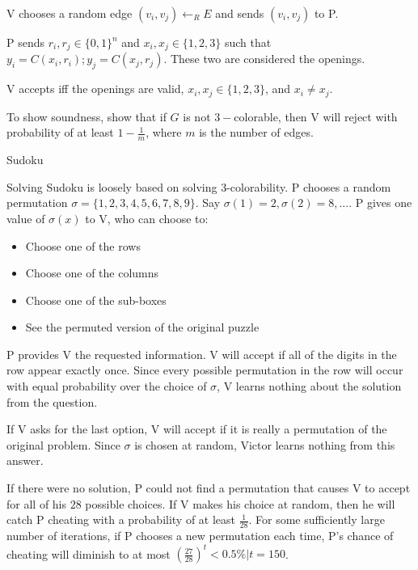 \documentclass[2pt,legalpaper]{scrartcl}
\makeatletter
\renewcommand{\subsection}{\@startsection{subsection}{2}{0mm}
  {-1explus -.5ex minus -.2ex}
  {0.5ex plus .2ex}
{\normalfont\normalsize\bfseries}}
\makeatother
\begin{document}
\begin{multicols}{6}
  V chooses a random edge $(v_i, v_j) \leftarrow_R E$ and sends $(v_i, v_j)$ to P.

  P sends $r_i, r_j \in \{0, 1\}^n$ and $x_i, x_j \in \{1, 2, 3\}$ such that $y_i = C(x_i, r_i); y_j = C(x_j, r_j)$. These two are considered the openings.

  V accepts iff the openings are valid, $x_i, x_j \in \{1, 2, 3\}$, and $x_i \neq x_j$.

  To show soundness, show that if $G$ is not $3-$colorable, then V will reject with probability of at least $1 - \frac{1}{m}$, where $m$ is the number of edges.

  \subsection{Sudoku}

  Solving Sudoku is loosely based on solving 3-colorability. P chooses a random permutation $\sigma = \{1, 2, 3, 4, 5, 6, 7, 8, 9\}$. Say $\sigma(1) = 2, \sigma(2) = 8, ...$. P gives one value of $\sigma(x)$ to V, who can choose to:
  
  \begin{itemize}
      \item Choose one of the rows
      \item Choose one of the columns
      \item Choose one of the sub-boxes
      \item See the permuted version of the original puzzle
  \end{itemize}
  
  P provides V the requested information. V will accept if all of the digits in the row appear exactly once. Since every possible permutation in the row will occur with equal probability over the choice of $\sigma$, V learns nothing about the solution from the question.
  
  If V asks for the last option, V will accept if it is really a permutation of the original problem. Since $\sigma$ is chosen at random, Victor learns nothing from this answer.
  
  If there were no solution, P could not find a permutation that causes V to accept for all of his $28$ possible choices. If V makes his choice at random, then he will catch P cheating with a probability of at least $\frac{1}{28}$. For some sufficiently large number of iterations, if P chooses a new permutation each time, P's chance of cheating will diminish to at most $(\frac{27}{28})^t < 0.5\%|t=150$.


\end{multicols}
\end{document}
